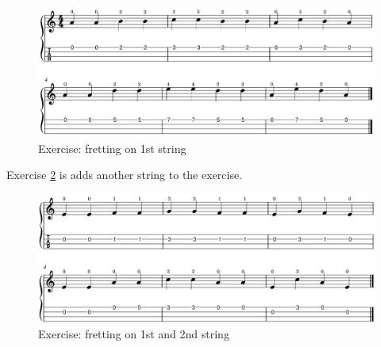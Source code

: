 \begin{figure}[h]
    \centering
    \includegraphics[width=\textwidth]{../../MuseScore/Ukulele/UkuleleExerciseFirstStringFretting.png}
    \caption{Exercise: fretting on 1st string}
    \label{fig:ukulele_exercise_fretting_fingering_first_string}
\end{figure}

Exercise \ref{fig:ukulele_exercise_fretting_fingering_first_and_second_string} is adds another string to the exercise.

\begin{figure}[h]
	\centering
	\includegraphics[width=\textwidth]{../../MuseScore/Ukulele/UkuleleExerciseTwoStringFretting.png}
	\caption{Exercise: fretting on 1st and 2nd string}
	\label{fig:ukulele_exercise_fretting_fingering_first_and_second_string}
\end{figure}